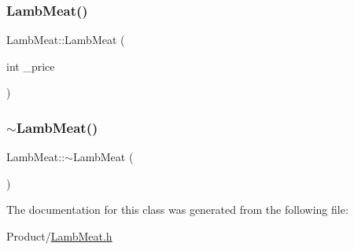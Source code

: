 \mbox{\label{classLambMeat_a0f6b0c1fd6058519518337b6df8dea1b}} 
\subsubsection{\texorpdfstring{LambMeat()}{LambMeat()}\hspace{0.1cm}{\footnotesize\ttfamily [2/2]}}
{\footnotesize\ttfamily Lamb\+Meat\+::\+Lamb\+Meat (\begin{DoxyParamCaption}\item[{int}]{\+\_\+price }\end{DoxyParamCaption})}

\mbox{\label{classLambMeat_a92d05cb893a6d325c83084ddc1d8a6da}} 
\subsubsection{\texorpdfstring{$\sim$LambMeat()}{~LambMeat()}}
{\footnotesize\ttfamily Lamb\+Meat\+::$\sim$\+Lamb\+Meat (\begin{DoxyParamCaption}{ }\end{DoxyParamCaption})}



The documentation for this class was generated from the following file\+:\begin{DoxyCompactItemize}
\item 
Product/\mbox{\hyperlink{LambMeat_8h}{Lamb\+Meat.\+h}}\end{DoxyCompactItemize}
